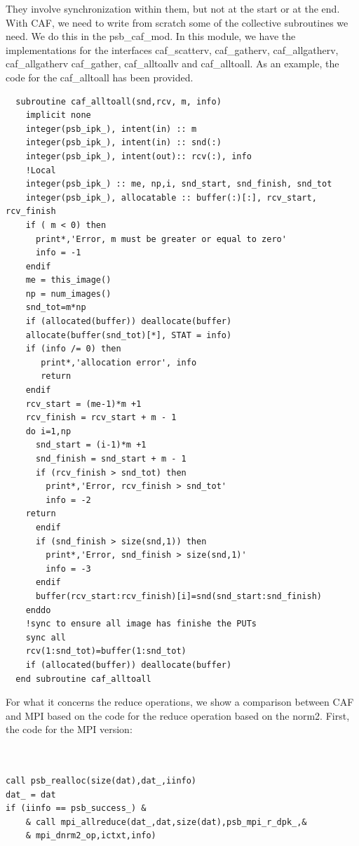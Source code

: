 \documentclass{IOS-Book-Article}
\begin{document}
They involve synchronization within them, but not at the start or at the end.  
With CAF, we need to write from scratch some of the collective subroutines we need.
We do this in the psb\_caf\_mod. In this module, we have the implementations for the interfaces caf\_scatterv, caf\_gatherv, caf\_allgatherv, caf\_allgatherv caf\_gather, caf\_alltoallv and caf\_alltoall. 
As an example, the code for the caf\_alltoall has been provided. 
\lstset{language=Fortran} 
{\small
\begin{lstlisting}
  subroutine caf_alltoall(snd,rcv, m, info)
    implicit none
    integer(psb_ipk_), intent(in) :: m
    integer(psb_ipk_), intent(in) :: snd(:)
    integer(psb_ipk_), intent(out):: rcv(:), info
    !Local
    integer(psb_ipk_) :: me, np,i, snd_start, snd_finish, snd_tot
    integer(psb_ipk_), allocatable :: buffer(:)[:], rcv_start, rcv_finish
    if ( m < 0) then
      print*,'Error, m must be greater or equal to zero'
      info = -1
    endif
    me = this_image()
    np = num_images()
    snd_tot=m*np
    if (allocated(buffer)) deallocate(buffer)
    allocate(buffer(snd_tot)[*], STAT = info)
    if (info /= 0) then
       print*,'allocation error', info
       return
    endif
    rcv_start = (me-1)*m +1
    rcv_finish = rcv_start + m - 1
    do i=1,np
      snd_start = (i-1)*m +1 
      snd_finish = snd_start + m - 1
      if (rcv_finish > snd_tot) then
        print*,'Error, rcv_finish > snd_tot'
        info = -2 
	return
      endif
      if (snd_finish > size(snd,1)) then
        print*,'Error, snd_finish > size(snd,1)'
        info = -3 
      endif
      buffer(rcv_start:rcv_finish)[i]=snd(snd_start:snd_finish)
    enddo
    !sync to ensure all image has finishe the PUTs 
    sync all
    rcv(1:snd_tot)=buffer(1:snd_tot)
    if (allocated(buffer)) deallocate(buffer)
  end subroutine caf_alltoall
\end{lstlisting}}
For what it concerns the reduce operations, we show a comparison between CAF and MPI based on the code for the reduce operation based on the norm2. 
First, the code for the MPI version:
\begin{center}
{\small
\begin{lstlisting}


call psb_realloc(size(dat),dat_,iinfo)
dat_ = dat
if (iinfo == psb_success_) &
    & call mpi_allreduce(dat_,dat,size(dat),psb_mpi_r_dpk_,&
    & mpi_dnrm2_op,ictxt,info)

\end{lstlisting}}
\end{center}
\end{document}
